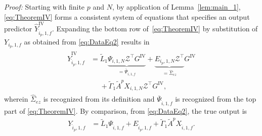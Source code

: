 \noindent \textit{Proof:} %
Starting with finite $p$ and $N$, by application of Lemma~\ref{lem:main_1}, \eqref{eq:TheoremIV} forms a consistent system of equations that specifies an output predictor $\widehat{Y}_{\hat{i}_p,1,f}^\mathrm{IV}$. Expanding the bottom row of~\eqref{eq:TheoremIV} by substitution of $Y_{i_p,1,f}$ as obtained from \eqref{eq:DataEq2} results in
\begin{align}\label{eq:Yf_hatIV_1}
\begin{split}\widehat{Y}_{\hat{i}_p,1,f}^\mathrm{IV} &= \widetilde{L}_1 \underbrace{\Psi_{i,1,N}\mathcal{Z}^\top G^\mathrm{IV}}_{=\overline{\Psi}_{\hat{i},1,f}} + \underbrace{E_{i_p,1,N}\mathcal{Z}^\top}_{=\hat{\Sigma}_{ez}} G^\mathrm{IV}\\ &\phantom{=}+ \widetilde{\Gamma}_1 \tilde{A}^p X_{i,1,N}\mathcal{Z}^\top G^\mathrm{IV},
\end{split}
\end{align}
wherein $\hat{\Sigma}_{ez}$ is recognized from its definition and $\overline{\Psi}_{\hat{i},1,f}$ is recognized from the top part of \eqref{eq:TheoremIV}. By comparison, from \eqref{eq:DataEq2}, the true output is
\begin{align}\label{eq:Yf_act}
    Y_{\hat{i}_p,1,f} &= \widetilde{L}_1 \Psi_{\hat{i},1,f} + E_{\hat{i}_p,1,f} + \widetilde{\Gamma}_1 \tilde{A}^p X_{\hat{i},1,f}.
\end{align}

